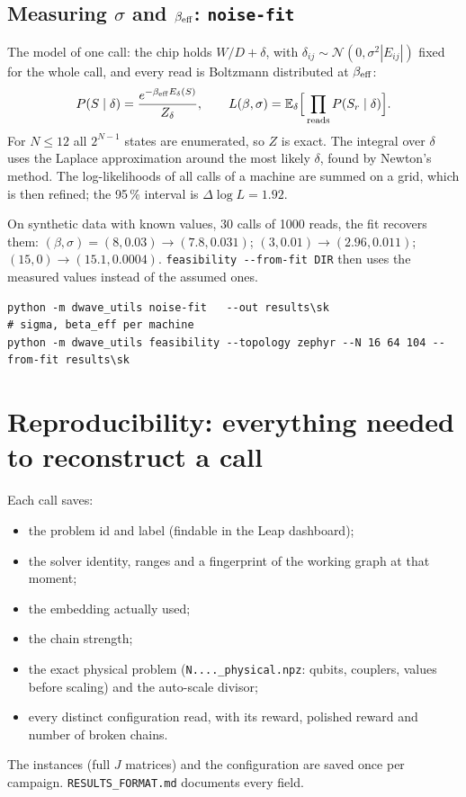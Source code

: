 \documentclass[11pt,a4paper]{article}
\newcommand{\code}[1]{\nolinkurl{#1}}
\newcommand{\src}[4]{}
\begin{document}
\subsection{Measuring \texorpdfstring{$\sigma$}{sigma} and \texorpdfstring{$\beta_{\rm eff}$}{beta\_eff}: \texorpdfstring{\code{noise-fit}}{noise-fit}}
The model of one call: the chip holds $W/D+\delta$, with $\delta_{ij}\sim\mathcal N(0,\sigma^2|E_{ij}|)$ fixed for
the whole call, and every read is Boltzmann distributed at $\beta_{\rm eff}$:
\[
P(S\mid\delta)=\frac{e^{-\beta_{\rm eff}E_\delta(S)}}{Z_\delta},\qquad
L(\beta,\sigma)=\mathbb E_\delta\Big[\prod_{\rm reads}P(S_r\mid\delta)\Big].
\]
For $N\le12$ all $2^{N-1}$ states are enumerated, so $Z$ is exact. The integral over $\delta$ uses the Laplace
approximation around the most likely $\delta$, found by Newton's method. The log-likelihoods of all calls of a
machine are summed on a grid, which is then refined; the 95\,\% interval is $\Delta\log L=1.92$.
\src{dwave_utils/noise_fit.py}{\rLoglikA}{\rLoglikB}{likelihood of one call}
On synthetic data with known values, 30 calls of 1000 reads, the fit recovers them:
$(\beta,\sigma)=(8,0.03)\to(7.8,0.031)$; $(3,0.01)\to(2.96,0.011)$; $(15,0)\to(15.1,0.0004)$.
\code{feasibility --from-fit DIR} then uses the measured values instead of the assumed ones.
\begin{lstlisting}
python -m dwave_utils noise-fit   --out results\sk                      # sigma, beta_eff per machine
python -m dwave_utils feasibility --topology zephyr --N 16 64 104 --from-fit results\sk
\end{lstlisting}

\section{Reproducibility: everything needed to reconstruct a call}
Each call saves:
\begin{itemize}
\item the problem id and label (findable in the Leap dashboard);
\item the solver identity, ranges and a fingerprint of the working graph at that moment;
\item the embedding actually used;
\item the chain strength;
\item the exact physical problem (\code{N....\_physical.npz}: qubits, couplers, values before scaling) and the auto-scale divisor;
\item every distinct configuration read, with its reward, polished reward and number of broken chains.
\end{itemize}
The instances (full $J$ matrices) and the configuration are saved once per campaign. \code{RESULTS_FORMAT.md} documents every field.
\end{document}
